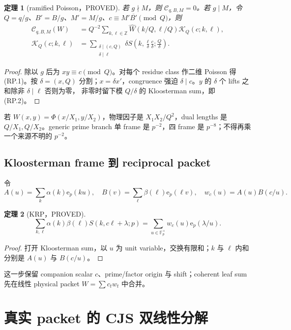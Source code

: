 \documentclass[11pt,a4paper]{ctexart}
\newtheorem{theorem}{定理}[section]
\theoremstyle{definition}
\newcommand{\e}{\mathrm e}
\newcommand{\1}{\mathbf 1}
\newcommand{\F}{\mathbb F}
\newcommand{\G}{\F_p^\times}
\newcommand{\PROVED}{\textcolor{green!40!black}{\textsf{PROVED}}}
\begin{document}
\begin{theorem}[ramified Poisson，\PROVED]
若 $g\nmid M$，则 $\mathcal C_{q,B,M}=0$。若 $g\mid M$，令
$Q=q/g$、$B'=B/g$、$M'=M/g$、$c\equiv M'\overline{B'}\pmod Q$，则
\begin{align}
 \mathcal C_{q,B,M}(W)
 &=Q^{-2}\sum_{k,\ell\in\mathbb Z}\widehat W(k/Q,\ell/Q)
   \mathcal K_Q(c;k,\ell),                           \tag{RP.1}\\
 \mathcal K_Q(c;k,\ell)
 &=\sum_{\substack{\delta\mid(c,Q)\\\delta\mid\ell}}
 \delta S\!\left(k,\frac\ell\delta\frac c\delta;\frac Q\delta\right).
                                                               \tag{RP.2}
\end{align}
\end{theorem}
\begin{proof}
除以 $g$ 后为 $xy\equiv c\pmod Q$。对每个 residue class 作二维 Poisson 得
(RP.1)。按 $\delta=(x,Q)$ 分割；$x=\delta x'$，congruence 强迫
$\delta\mid c$。$y$ 的 $\delta$ 个 lifts 之和除非 $\delta\mid\ell$ 否则为零，
非零时留下模 $Q/\delta$ 的 Kloosterman sum，即 (RP.2)。
\end{proof}

若 $W(x,y)=\Phi(x/X_1,y/X_2)$，物理因子是 $X_1X_2/Q^2$，dual lengths
是 $Q/X_1,Q/X_2$。generic prime branch 单 frame 是 $p^{-2}$，四 frame
是 $p^{-8}$；不得再乘一个来源不明的 $p^{-2}$。

\subsection{Kloosterman frame 到 reciprocal packet}

令
\[
 A(u)=\sum_k\alpha(k)\e_p(ku),\quad
 B(v)=\sum_\ell\beta(\ell)\e_p(\ell v),\quad
 w_c(u)=A(u)B(c/u).
\]

\begin{theorem}[KRP，\PROVED]
\[
 \boxed{\sum_{k,\ell}\alpha(k)\beta(\ell)S(k,c\ell+\lambda;p)
 =\sum_{u\in\G}w_c(u)\e_p(\lambda/u).}              \tag{KRP.1}
\]
\end{theorem}
\begin{proof}
打开 Kloosterman sum，以 $u$ 为 unit variable，交换有限和；$k$ 与 $\ell$
内和分别是 $A(u)$ 与 $B(c/u)$。
\end{proof}

这一步保留 companion scalar $c$、prime/factor origin 与 shift；coherent leaf
sum 先在线性 physical packet $W=\sum c_tw_t$ 中合并。

\section{真实 packet 的 CJS 双线性分解}
\label{sec:cjs}
\end{document}
